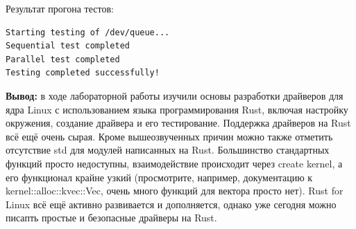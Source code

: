 \documentclass[a4paper,14pt]{extarticle}
\begin{document}
Результат прогона тестов:\\
\begin{verbatim}
Starting testing of /dev/queue...
Sequential test completed
Parallel test completed
Testing completed successfully!
\end{verbatim}


\textbf{Вывод: } в ходе лабораторной работы изучили основы разработки драйверов для ядра Linux с использованием языка
программирования Rust, включая настройку окружения, создание драйвера и его тестирование. Поддержка драйверов на Rust 
всё ещё очень сырая. Кроме вышеозвученных причин можно также отметить отсутствие std для модулей написанных на Rust. 
Большинство стандартных функций просто недоступны, взаимодействие происходит через create kernel, а его функционал
крайне узкий (просмотрите, например, документацию к kernel::alloc::kvec::Vec, очень много функций для вектора просто нет).
Rust for Linux всё ещё активно развивается и дополняется, однако уже сегодня можно писапть простые и безопасные драйверы
на Rust.
\end{document}
